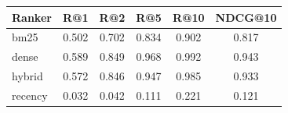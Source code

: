 \begin{tabular}{lccccc}
\toprule
Ranker & R@1 & R@2 & R@5 & R@10 & NDCG@10 \\
\midrule
bm25 & 0.502 & 0.702 & 0.834 & 0.902 & 0.817 \\
dense & 0.589 & 0.849 & 0.968 & 0.992 & 0.943 \\
hybrid & 0.572 & 0.846 & 0.947 & 0.985 & 0.933 \\
recency & 0.032 & 0.042 & 0.111 & 0.221 & 0.121 \\
\bottomrule
\end{tabular}

